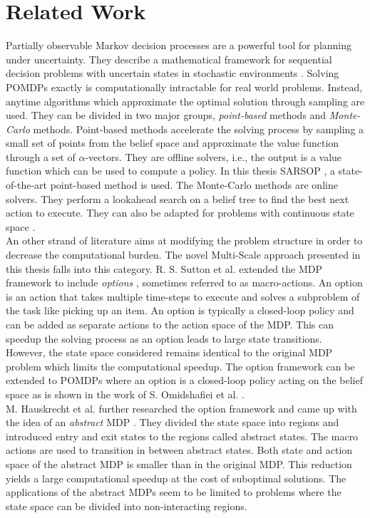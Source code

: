 \section{Related Work}\label{sec:relatedwork}
Partially observable Markov decision processes are a powerful tool for planning under uncertainty. They describe a mathematical framework for sequential decision problems with uncertain states in stochastic environments \cite{10.2307/168926}. Solving POMDPs exactly \cite{KAELBLING199899} is computationally intractable for real world problems. Instead, anytime algorithms which approximate the optimal solution through sampling are used. They can be divided in two major groups, \textit{point-based} methods and \textit{Monte-Carlo} methods. Point-based methods \cite{10.5555/1630659.1630806, Spaan_2005, 6284837} accelerate the solving process by sampling a small set of points from the belief space and approximate the value function through a set of $\alpha$-vectors. They are offline solvers, i.e., the output is a value function which can be used to compute a policy. In this thesis SARSOP \cite{6284837}, a state-of-the-art point-based method is used. The Monte-Carlo methods \cite{NIPS2010_4031, NIPS2013_5189, Bai2011} are online solvers. They perform a lookahead search on a belief tree to find the best next action to execute. They can also be adapted for problems with continuous state space \cite{Bai2011}.\\

An other strand of literature aims at modifying the problem structure in order to decrease the computational burden. The novel Multi-Scale approach presented in this thesis falls into this category. R. S. Sutton et al. extended the MDP framework to include \textit{options} \cite{SUTTON1999181}, sometimes referred to as macro-actions. An option is an action that takes multiple time-steps to execute and solves a subproblem of the task like picking up an item.  An option is typically a closed-loop policy and can be added as separate actions to the action space of the MDP. This can speedup the solving process as an option leads to large state transitions. However, the state space considered remains identical to the original MDP problem which limits the computational speedup. The option framework can be extended to POMDPs where an option is a closed-loop policy acting on the belief space as is shown in the work of S. Omidshafiei et al. \cite{7140035}.\\
M. Hauskrecht et al. further researched the option framework and came up with the idea of an \textit{abstract} MDP \cite{DBLP:journals/corr/abs-1301-7381}. They divided the state space into regions and introduced entry and exit states to the regions called abstract states. The macro actions are used to transition in between abstract states. Both state and action space of the abstract MDP is smaller than in the original MDP. This reduction yields a large computational speedup at the cost of suboptimal solutions. The applications of the abstract MDPs seem to be limited to problems where the state space can be divided into non-interacting regions.\\

